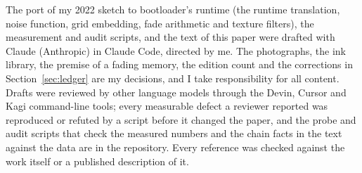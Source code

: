 \documentclass[11pt]{article}
\begin{document}
The port of my 2022 sketch to bootloader's runtime (the runtime translation, noise function, grid embedding, fade arithmetic and texture filters), the measurement and audit scripts, and the text of this paper were drafted with Claude (Anthropic) in Claude Code, directed by me. The photographs, the ink library, the premise of a fading memory, the edition count and the corrections in Section~\ref{sec:ledger} are my decisions, and I take responsibility for all content. Drafts were reviewed by other language models through the Devin, Cursor and Kagi command-line tools; every measurable defect a reviewer reported was reproduced or refuted by a script before it changed the paper, and the probe and audit scripts that check the measured numbers and the chain facts in the text against the data are in the repository. Every reference was checked against the work itself or a published description of it.



\end{document}
